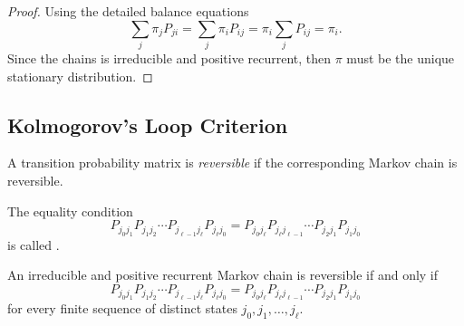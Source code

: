 \documentclass[12pt]{article}
\begin{document}
\begin{proof}
    Using the detailed balance equations
    \[
        \sum_j \pi_j P_{ji} = \sum_j \pi_i P_{ij} = \pi_i \sum_j P_{ij}
        = \pi_i.
    \] Since the chains is irreducible and positive recurrent, then \(
    \pi \) must be the unique stationary distribution.
\end{proof}

\subsection*{Kolmogorov's Loop Criterion}

A transition probability matrix is \emph{reversible}%
if the corresponding Markov chain is reversible.
\begin{definition}
    The equality condition
    \begin{equation}
        \label{eq:reversiblemarkovchain:loopprob} P_{j_0 j_1} P_{j_1 j_2} \cdots
        P_{j_{\ell-1} j_\ell} P_{j_\ell j_0} = P_{j_0 j_\ell} P_{j_\ell
        j_{\ell-1}} \cdots P_{j_2 j_1} P_{j_1 j_0}
    \end{equation}
    is called .%
\end{definition}

\begin{theorem}
    An irreducible and positive recurrent Markov chain is reversible if
    and only if
    \[
        P_{j_0 j_1} P_{j_1 j_2} \cdots P_{j_{\ell-1} j_\ell} P_{j_\ell
        j_0} = P_{j_0 j_\ell} P_{j_\ell j_{\ell-1}} \cdots P_{j_2 j_1} P_
        {j_1 j_0}
    \] for every finite sequence of distinct states \( j_0, j_1, \dots, j_\ell
    \).
\end{theorem}
\end{document}
